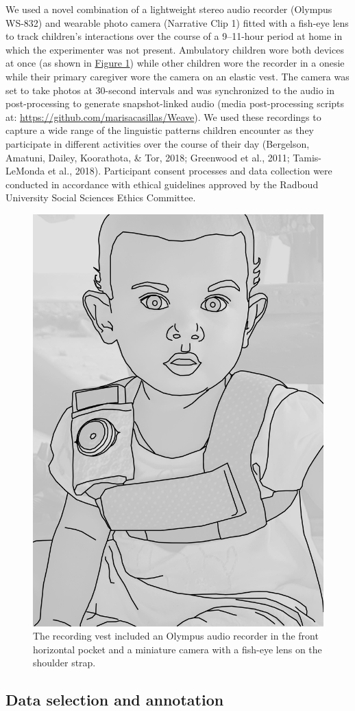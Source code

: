\documentclass[floatsintext,man]{apa6}
\theoremstyle{definition}
\theoremstyle{definition}
\theoremstyle{definition}
\theoremstyle{remark}
\begin{document}
We used a novel combination of a lightweight stereo audio recorder
(Olympus WS-832) and wearable photo camera (Narrative Clip 1) fitted
with a fish-eye lens to track children's interactions over the course of
a 9--11-hour period at home in which the experimenter was not present.
Ambulatory children wore both devices at once (as shown in
\protect\hyperlink{fig1}{Figure 1}) while other children wore the
recorder in a onesie while their primary caregiver wore the camera on an
elastic vest. The camera was set to take photos at 30-second intervals
and was synchronized to the audio in post-processing to generate
snapshot-linked audio (media post-processing scripts at:
\url{https://github.com/marisacasillas/Weave}). We used these recordings
to capture a wide range of the linguistic patterns children encounter as
they participate in different activities over the course of their day
(Bergelson, Amatuni, Dailey, Koorathota, \& Tor, 2018; Greenwood et al.,
2011; Tamis-LeMonda et al., 2018). Participant consent processes and
data collection were conducted in accordance with ethical guidelines
approved by the Radboud University Social Sciences Ethics Committee.

\begin{figure}

{\centering \includegraphics[width=0.3\linewidth]{Tseltal-CLE_files/TseltalCLE-RecordingVest} 

}

\caption{The recording vest included an Olympus audio recorder in the front horizontal pocket and a miniature camera with a fish-eye lens on the shoulder strap.}\label{fig:fig1}
\end{figure}

\subsection{Data selection and annotation}\label{methods-samples}
\end{document}
